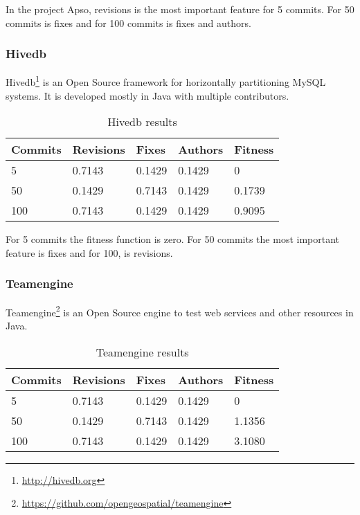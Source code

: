 In the project Apso, revisions is the most important feature for 5 commits. For
50 commits is fixes and for 100 commits is fixes and authors.

\subsubsection{Hivedb}
Hivedb\footnote{\url{http://hivedb.org}} is an Open Source framework for
horizontally partitioning MySQL systems. It is developed mostly in Java with
multiple contributors.

\begin{table}[H]
    \centering
    \caption{Hivedb results}
    \label{table:learning_hivedb}
    \begin{tabular}{|l|l|l|l|l|}
        \hline
        Commits & Revisions & Fixes & Authors & Fitness \\ \hline
        5         & 0.7143     & 0.1429 & 0.1429   & 0  \\ \hline
        50        & 0.1429 & 0.7143 & 0.1429   & 0.1739 \\ \hline
        100       & 0.7143     & 0.1429  & 0.1429   & 0.9095 \\ \hline
    \end{tabular}
\end{table}

For 5 commits the fitness function is zero. For 50 commits the most important
feature is fixes and for 100, is revisions.

\subsubsection{Teamengine}
Teamengine\footnote{\url{https://github.com/opengeospatial/teamengine}} is an
Open Source engine to test web services and other resources in Java.

\begin{table}[H]
    \centering
    \caption{Teamengine results}
    \label{table:learning_teamengine}
    \begin{tabular}{|l|l|l|l|l|}
        \hline
        Commits & Revisions & Fixes & Authors & Fitness \\ \hline
        5         & 0.7143     & 0.1429 & 0.1429   & 0  \\ \hline
        50        & 0.1429 & 0.7143 & 0.1429   & 1.1356 \\ \hline
        100       & 0.7143     & 0.1429  & 0.1429   & 3.1080 \\ \hline
    \end{tabular}
\end{table}

